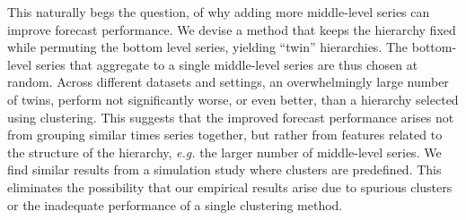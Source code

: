 \documentclass[a4paper,review,12pt,authoryear]{elsarticle}
\begin{document}
This naturally begs the question, of why adding more middle-level series can improve forecast performance. We devise a method that keeps the hierarchy fixed while permuting the bottom level series, yielding ``twin'' hierarchies. The bottom-level series that aggregate to a single middle-level series are thus chosen at random. Across different datasets and settings, an overwhelmingly large number of twins, perform not significantly worse, or even better, than a hierarchy selected using clustering. This suggests that the improved forecast performance arises not from grouping similar times series together, but rather from features related to the structure of the hierarchy, \textit{e.g.} the larger number of middle-level series. We find similar results from a simulation study where clusters are predefined. %
This eliminates the possibility that our empirical results arise due to  spurious clusters or the inadequate performance of a single clustering method.
\end{document}
